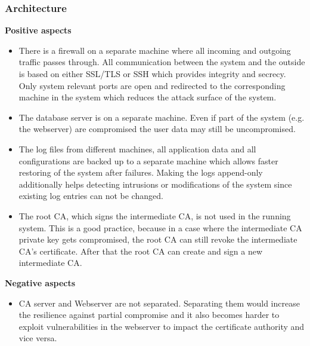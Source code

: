 \documentclass[english]{article}
\begin{document}
\subsubsection{Architecture}
\textbf{Positive aspects}
\begin{itemize}
\item There is a firewall on a separate machine where all incoming and outgoing traffic passes through. All communication between the system and the outside is based on either SSL/TLS or SSH which provides integrity and secrecy. Only system relevant ports are open and redirected to the corresponding machine in the system which reduces the attack surface of the system.
\item The database server is on a separate machine. Even if part of the system (e.g. the webserver) are compromised the user data may still be uncompromised.
\item The log files from different machines, all application data and all configurations are backed up to a separate machine which allows faster restoring of the system after failures. Making the logs append-only additionally helps detecting intrusions or modifications of the system since existing log entries can not be changed. 

\item The root CA, which signs the intermediate CA, is not used in the running system. This is a good practice, because in a case where the intermediate CA private key gets compromised, the root CA can still revoke the intermediate CA's certificate. After that the root CA can create and sign a new intermediate CA.
  
\end{itemize}

\textbf{Negative aspects}
\begin{itemize}
\item CA server and Webserver are not separated. Separating them would increase the resilience against partial compromise and it also becomes harder to exploit vulnerabilities in the webserver to impact the certificate authority and vice versa.
\end{itemize}
\end{document}
